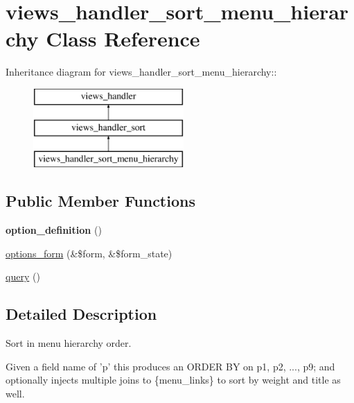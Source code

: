 \hypertarget{classviews__handler__sort__menu__hierarchy}{
\section{views\_\-handler\_\-sort\_\-menu\_\-hierarchy Class Reference}
\label{classviews__handler__sort__menu__hierarchy}
}
Inheritance diagram for views\_\-handler\_\-sort\_\-menu\_\-hierarchy::\begin{figure}[H]
\begin{center}
\leavevmode
\includegraphics[height=3cm]{classviews__handler__sort__menu__hierarchy}
\end{center}
\end{figure}
\subsection*{Public Member Functions}
\begin{DoxyCompactItemize}
\item 
\hypertarget{classviews__handler__sort__menu__hierarchy_a17f20ea55b1b4c734ca6e649815e9c3f}{
{\bfseries option\_\-definition} ()}
\label{classviews__handler__sort__menu__hierarchy_a17f20ea55b1b4c734ca6e649815e9c3f}

\item 
\hyperlink{classviews__handler__sort__menu__hierarchy_a845b181c31d1e5e0da9a99663ad195e3}{options\_\-form} (\&\$form, \&\$form\_\-state)
\item 
\hyperlink{classviews__handler__sort__menu__hierarchy_a04fd6337ac7ec486789586b65cf545fd}{query} ()
\end{DoxyCompactItemize}


\subsection{Detailed Description}
Sort in menu hierarchy order.

Given a field name of 'p' this produces an ORDER BY on p1, p2, ..., p9; and optionally injects multiple joins to \{menu\_\-links\} to sort by weight and title as well.

